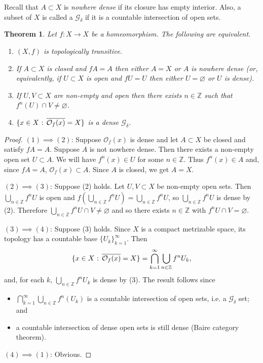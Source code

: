 \documentclass[12pt]{article}
\newtheorem{theorem}{Theorem}[section]
\theoremstyle{definition}
\theoremstyle{remark}
\begin{document}
Recall that $A \subset X$ is {\it nowhere dense} if its closure has empty interior.
Also, a subset of $X$ is called a $\mathcal G_\delta$ if it is a countable intersection of open sets.

\begin{theorem} \label{equiv_to_tt}
Let $f : X \to X$ be a homeomorphism.
The following are equivalent.
\begin{enumerate}
\item[(1)]
$(X,f)$ is topologically transitive.
\item[(2)]
If $A \subset X$ is closed and $fA=A$ then either $A=X$ or $A$ is nowhere dense (or,
equivalently, if $U \subset X$ is open and $fU=U$ then either $U = \varnothing$ or $U$ is dense).
\item[(3)]
If $U,V \subset X$ are non-empty and open then there exists $n \in \mathbb Z$ such that
$f^n(U) \cap V \ne \varnothing$.
\item[(4)]
$\{x \in X \hbox{ : } \overline{\mathcal O_f(x)}=X\}$ is a dense $\mathcal G_\delta$.
\end{enumerate}
\end{theorem}

\begin{proof}
$(1) \implies (2)$: Suppose $\mathcal O_f(x)$ is dense and let $A \subset X$ be closed and satisfy 
$fA=A$. Suppose $A$ is not nowhere dense. Then there exists a non-empty open set 
$U \subset A$. We will have $f^n(x) \in U$ for some $n \in \mathbb Z$. Thus $f^n(x) \in A$ and,
since $fA=A$, $\mathcal O_f(x) \subset A$. Since $A$ is closed, we get $A=X$.

\smallskip
\noindent
$(2) \implies (3)$: Suppose (2) holds. Let $U,V \subset X$ be non-empty open sets. Then
$\bigcup_{n \in \mathbb Z} f^nU$ is open and $f\left(\bigcup_{n \in \mathbb Z} f^nU\right)
=\bigcup_{n \in \mathbb Z} f^nU$, so $\bigcup_{n \in \mathbb Z} f^nU$ is dense by (2). Therefore 
$\bigcup_{n \in \mathbb Z} f^nU \cap V \ne \varnothing$ and so there exists $n \in \mathbb Z$ with 
$f^nU \cap V= \varnothing$.

\smallskip
\noindent
$(3) \implies (4)$: Suppose (3) holds. 
Since $X$ is a compact metrizable space, its topology has a countable base $\{U_k\}_{k=1}^\infty$.
Then
\[
\{x \in X \hbox{ : } \overline{\mathcal O_f(x)}=X\}
= \bigcap_{k=1}^\infty \bigcup_{n \in \mathbb Z} f^nU_k,
 \]
 and, for each $k$, $\bigcup_{n \in \mathbb Z} f^nU_k$ is dense by (3). The result follows
 since
 \begin{itemize}
 \item $\bigcap_{k=1}^\infty \bigcup_{n \in \mathbb Z} f^n(U_k)$ is a countable intersection of open sets, i.e. a $\mathcal G_\delta$ set; and
 \item
 a countable intersection of dense open sets is still dense (Baire category theorem).
\end{itemize}
 
 \smallskip
 \noindent
 $(4) \implies (1)$: Obvious.
\end{proof}
\end{document}
